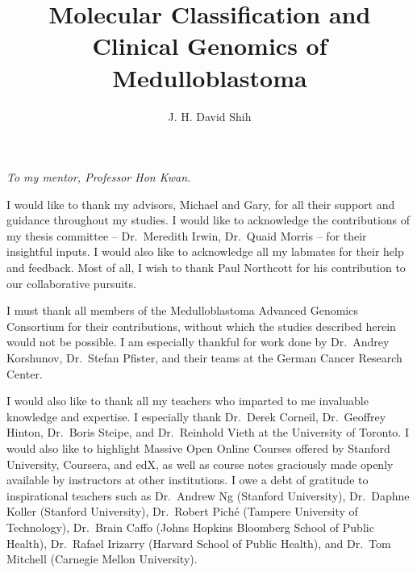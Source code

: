 \documentclass[12pt]{ut-thesis}
\author{J. H. David Shih}
\title{\textbf{Molecular Classification and Clinical Genomics of Medulloblastoma}}
\begin{document}

\begin{preliminary}

\maketitle

\cleardoublepage

\begin{abstract}
\setlength{\parindent}{0em}

\end{abstract}

\cleardoublepage

\begin{dedication}
\begin{center}
\vspace{1in}
\emph{To my mentor, Professor Hon Kwan.}
\end{center}
\end{dedication}

\newpage

\begin{acknowledgements}
I would like to thank my advisors, Michael and Gary, for all their support and guidance throughout my studies. I would like to acknowledge the contributions of my thesis committee -- Dr.\ Meredith Irwin, Dr.\ Quaid Morris -- for their insightful inputs. I would also like to acknowledge all my labmates for their help and feedback. Most of all, I wish to thank Paul Northcott for his contribution to our collaborative pursuits.

I must thank all members of the Medulloblastoma Advanced Genomics Consortium for their contributions, without which the studies described herein would not be possible. I am especially thankful for work done by Dr.\ Andrey Korshunov, Dr.\ Stefan Pfister, and their teams at the German Cancer Research Center.

I would also like to thank all my teachers who imparted to me invaluable knowledge and expertise. I especially thank Dr.\ Derek Corneil, Dr.\ Geoffrey Hinton, Dr.\ Boris Steipe, and Dr.\ Reinhold Vieth at the University of Toronto. I would also like to highlight Massive Open Online Courses offered by Stanford University, Coursera, and edX, as well as course notes graciously made openly available by instructors at other institutions. I owe a debt of gratitude to inspirational teachers such as Dr.\ Andrew Ng (Stanford University), Dr.\ Daphne Koller (Stanford University), Dr.\ Robert Pich\'{e} (Tampere University of Technology), Dr.\ Brain Caffo (Johns Hopkins Bloomberg School of Public Health), Dr.\ Rafael Irizarry (Harvard School of Public Health), and Dr.\ Tom Mitchell (Carnegie Mellon University).


\end{acknowledgements}
\end{preliminary}
\end{document}
